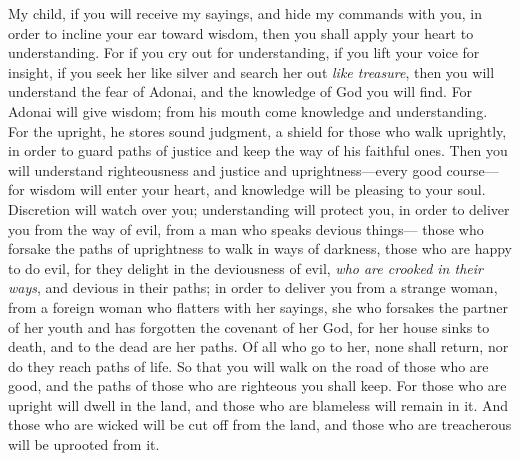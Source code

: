 \begin{biblechapter} %
 My child, if you will receive my sayings, 
and hide my commands with you,
\verse in order to incline your ear toward wisdom, 
then you shall apply your heart to understanding.
\verse For if you cry out for understanding, 
if you lift your voice for insight,
\verse if you seek her like silver 
and search her out \textit{like treasure},
\verse then you will understand the fear of Adonai, 
and the knowledge of God you will find.
\verse For Adonai will give wisdom; 
from his mouth come knowledge and understanding.
\verse For the upright, he stores sound judgment, a shield for those who walk uprightly,
\verse in order to guard paths of justice 
and keep the way of his faithful ones.
\verse Then you will understand righteousness and justice 
and uprightness—every good course—
\verse for wisdom will enter your heart, 
and knowledge will be pleasing to your soul.
\verse Discretion will watch over you; 
understanding will protect you,
\verse in order to deliver you from the way of evil, 
from a man who speaks devious things—
\verse those who forsake the paths of uprightness 
to walk in ways of darkness,
\verse those who are happy to do evil, 
for they delight in the deviousness of evil,
\verse \textit{who are crooked in their ways}, 
and devious in their paths;
\verse in order to deliver you from a strange woman, 
from a foreign woman who flatters with her sayings,
\verse she who forsakes the partner of her youth 
and has forgotten the covenant of her God,
\verse for her house sinks to death, 
and to the dead are her paths.
\verse Of all who go to her, none shall return, 
nor do they reach paths of life.
\verse So that you will walk on the road of those who are good, 
and the paths of those who are righteous you shall keep.
\verse For those who are upright will dwell in the land, 
and those who are blameless will remain in it.
\verse And those who are wicked will be cut off from the land, 
and those who are treacherous will be uprooted from it.
\end{biblechapter}

